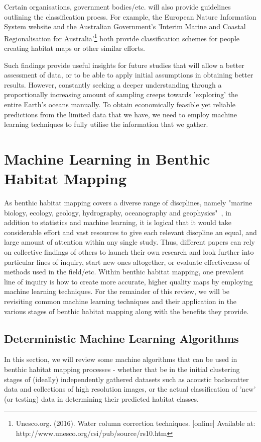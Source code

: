             Certain organisations, government bodies/etc. will also provide guidelines outlining the classification proess. For example, the European Nature Information System website and the Australian Government's 'Interim Marine and Coastal Regionalisation for Australia'\footnote{Unesco.org. (2016). Water column correction techniques. [online] Available at: http://www.unesco.org/csi/pub/source/rs10.htm} both provide classification schemes for people creating habitat maps or other similar efforts.

            Such findings provide useful insights for future studies that will allow a better assessment of data, or to be able to apply initial assumptions in obtaining better results. However, constantly seeking a deeper understanding through a proportionally increasing amount of sampling creeps towards 'exploring' the entire Earth's oceans manually. To obtain economically feasible yet reliable predictions from the limited data that we have, we need to employ machine learning techniques to fully utilise the information that we gather.

            \section{Machine Learning in Benthic Habitat Mapping}
            As benthic habitat mapping covers a diverse range of discplines, namely "marine biology, ecology, geology, hydrography, oceanography and geophysics"~\citep{cjbrown11}, in addition to statistics and machine learning, it is logical that it would take considerable effort and vast resources to give each relevant discpline an equal, and large amount of attention within any single study. Thus, different papers can rely on collective findings of others to launch their own research and look further into particular lines of inquiry, start new ones altogether, or evaluate effectiveness of methods used in the field/etc. Within benthic habitat mapping, one prevalent line of inquiry is how to create more accurate, higher quality maps by employing machine learning techniques. For the remainder of this review, we will be revisiting common machine learning techniques and their application in the various stages of benthic habitat mapping along with the benefits they provide.

            \subsection{Deterministic Machine Learning Algorithms}
            In this section, we will review some machine algorithms that can be used in benthic habitat mapping processes - whether that be in the initial clustering stages of (ideally) independently gathered datasets such as acoustic backscatter data and collections of high resolution images, or the actual classification of 'new' (or testing) data in determining their predicted habitat classes.

